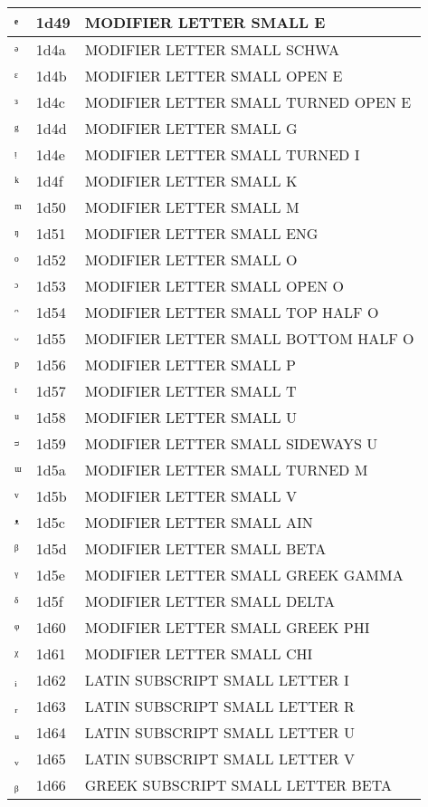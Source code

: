 \documentclass[12pt,letterpaper,openany]{book}
\begin{document}
\begin{center}
\begin{supertabular}{|m{0.25in}|m{0.5in}|m{4in}|}
ᵉ & 1d49 & MODIFIER LETTER SMALL E\\\hline
ᵊ & 1d4a & MODIFIER LETTER SMALL SCHWA\\\hline
ᵋ & 1d4b & MODIFIER LETTER SMALL OPEN E\\\hline
ᵌ & 1d4c & MODIFIER LETTER SMALL TURNED OPEN E\\\hline
ᵍ & 1d4d & MODIFIER LETTER SMALL G\\\hline
ᵎ & 1d4e & MODIFIER LETTER SMALL TURNED I\\\hline
ᵏ & 1d4f & MODIFIER LETTER SMALL K\\\hline
ᵐ & 1d50 & MODIFIER LETTER SMALL M\\\hline
ᵑ & 1d51 & MODIFIER LETTER SMALL ENG\\\hline
ᵒ & 1d52 & MODIFIER LETTER SMALL O\\\hline
ᵓ & 1d53 & MODIFIER LETTER SMALL OPEN O\\\hline
ᵔ & 1d54 & MODIFIER LETTER SMALL TOP HALF O\\\hline
ᵕ & 1d55 & MODIFIER LETTER SMALL BOTTOM HALF O\\\hline
ᵖ & 1d56 & MODIFIER LETTER SMALL P\\\hline
ᵗ & 1d57 & MODIFIER LETTER SMALL T\\\hline
ᵘ & 1d58 & MODIFIER LETTER SMALL U\\\hline
ᵙ & 1d59 & MODIFIER LETTER SMALL SIDEWAYS U\\\hline
ᵚ & 1d5a & MODIFIER LETTER SMALL TURNED M\\\hline
ᵛ & 1d5b & MODIFIER LETTER SMALL V\\\hline
ᵜ & 1d5c & MODIFIER LETTER SMALL AIN\\\hline
ᵝ & 1d5d & MODIFIER LETTER SMALL BETA\\\hline
ᵞ & 1d5e & MODIFIER LETTER SMALL GREEK GAMMA\\\hline
ᵟ & 1d5f & MODIFIER LETTER SMALL DELTA\\\hline
ᵠ & 1d60 & MODIFIER LETTER SMALL GREEK PHI\\\hline
ᵡ & 1d61 & MODIFIER LETTER SMALL CHI\\\hline
ᵢ & 1d62 & LATIN SUBSCRIPT SMALL LETTER I\\\hline
ᵣ & 1d63 & LATIN SUBSCRIPT SMALL LETTER R\\\hline
ᵤ & 1d64 & LATIN SUBSCRIPT SMALL LETTER U\\\hline
ᵥ & 1d65 & LATIN SUBSCRIPT SMALL LETTER V\\\hline
ᵦ & 1d66 & GREEK SUBSCRIPT SMALL LETTER BETA\\\hline

\end{supertabular}
\end{center}
\end{document}
